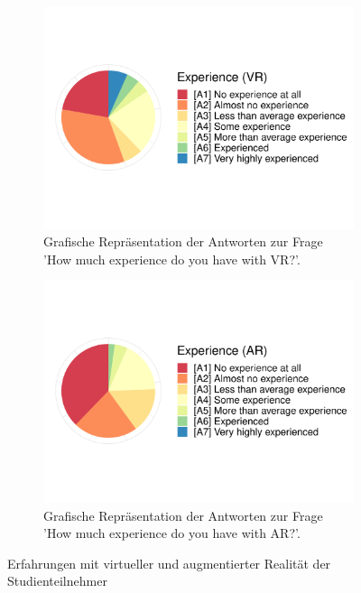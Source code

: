 \begin{figure}
	\begin{subfigure}{0.48\textwidth}
		\includegraphics[width=\textwidth]{./appendices/expVr}
		\caption{Grafische Repräsentation der Antworten zur Frage 'How much experience do you have with VR?'.}
		\label{fig:expVr}
	\end{subfigure}%
	\hfill
	\begin{subfigure}{0.48\textwidth}
		\includegraphics[width=\textwidth]{./appendices/expAr}
		\caption{Grafische Repräsentation der Antworten zur Frage 'How much experience do you have with AR?'.}
		\label{fig:expAr}
	\end{subfigure}
	\caption{Erfahrungen mit virtueller und augmentierter Realität der Studienteilnehmer}
\end{figure}


